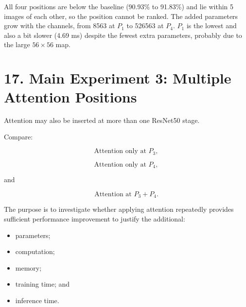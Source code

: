 \documentclass[10pt]{article}
\begin{document}
All four positions are below the baseline (90.93\% to 91.83\%) and lie within 5 images of each other, so the position cannot be ranked. The added parameters grow with the channels, from 8563 at $P_1$ to 526563 at $P_4$. $P_1$ is the lowest and also a bit slower (4.69 ms) despite the fewest extra parameters, probably due to the large $56\times56$ map.

\section*{17. Main Experiment 3: Multiple Attention Positions}

Attention may also be inserted at more than one ResNet50 stage.

Compare:

\[
\text{Attention only at }P_3,
\]

\[
\text{Attention only at }P_4,
\]

and

\[
\text{Attention at }P_3+P_4.
\]

The purpose is to investigate whether applying attention repeatedly provides
sufficient performance improvement to justify the additional:

\begin{itemize}

\item parameters;

\item computation;

\item memory;

\item training time; and

\item inference time.

\end{itemize}
\end{document}
